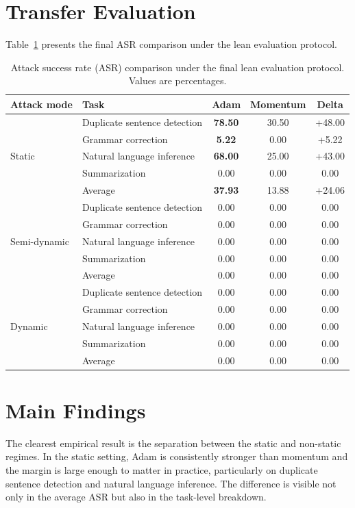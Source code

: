 \documentclass[12pt,a4paper]{report}
\begin{document}
\section{Transfer Evaluation}
Table~\ref{tab:asr_main} presents the final ASR comparison under the lean evaluation protocol.

\begin{table}[H]
\centering
\caption{Attack success rate (ASR) comparison under the final lean evaluation protocol. Values are percentages.}
\label{tab:asr_main}
\begin{tabular}{llccc}
\toprule
\textbf{Attack mode} & \textbf{Task} & \textbf{Adam} & \textbf{Momentum} & \textbf{Delta} \\
\midrule
\multirow{5}{*}{Static}
& Duplicate sentence detection & \textbf{78.50} & 30.50 & +48.00 \\
& Grammar correction & \textbf{5.22} & 0.00 & +5.22 \\
& Natural language inference & \textbf{68.00} & 25.00 & +43.00 \\
& Summarization & 0.00 & 0.00 & 0.00 \\
& Average & \textbf{37.93} & 13.88 & +24.06 \\
\midrule
\multirow{5}{*}{Semi-dynamic}
& Duplicate sentence detection & 0.00 & 0.00 & 0.00 \\
& Grammar correction & 0.00 & 0.00 & 0.00 \\
& Natural language inference & 0.00 & 0.00 & 0.00 \\
& Summarization & 0.00 & 0.00 & 0.00 \\
& Average & 0.00 & 0.00 & 0.00 \\
\midrule
\multirow{5}{*}{Dynamic}
& Duplicate sentence detection & 0.00 & 0.00 & 0.00 \\
& Grammar correction & 0.00 & 0.00 & 0.00 \\
& Natural language inference & 0.00 & 0.00 & 0.00 \\
& Summarization & 0.00 & 0.00 & 0.00 \\
& Average & 0.00 & 0.00 & 0.00 \\
\bottomrule
\end{tabular}
\end{table}

\section{Main Findings}
The clearest empirical result is the separation between the static and non-static regimes. In the static setting, Adam is consistently stronger than momentum and the margin is large enough to matter in practice, particularly on duplicate sentence detection and natural language inference. The difference is visible not only in the average ASR but also in the task-level breakdown.
\end{document}
